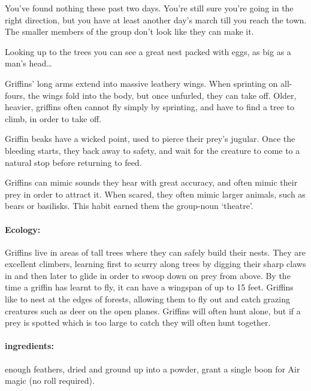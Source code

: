 \begin{multicols}{2}
\begin{boxtext}
  You've found nothing these past two days.
  You're still sure you're going in the right direction, but you have at least another day's march till you reach the town.
  The smaller members of the group don't look like they can make it.

  Looking up to the trees you can see a great nest packed with eggs, as big as a man's head\ldots
\end{boxtext}

Griffins' long arms extend into massive leathery wings.
When sprinting on all-fours, the wings fold into the body, but once unfurled, they can take off.
Older, heavier, griffins often cannot fly simply by sprinting, and have to find a tree to climb, in order to take off.

Griffin beaks have a wicked point, used to pierce their prey's jugular.
Once the bleeding starts, they back away to safety, and wait for the creature to come to a natural stop before returning to feed.

Griffins can mimic sounds they hear with great accuracy, and often mimic their prey in order to attract it.
When scared, they often mimic larger animals, such as bears or basilisks.
This habit earned them the group-noun `theatre'.


\paragraph{Ecology:} Griffins live in areas of tall trees where they can safely build their nests.
They are excellent climbers, learning first to scurry along trees by digging their sharp claws in and then later to glide in order to swoop down on prey from above.
By the time a griffin has learnt to fly, it can have a wingspan of up to 15 feet.
Griffins like to nest at the edges of forests, allowing them to fly out and catch grazing creatures such as deer on the open planes.
Griffins will often hunt alone, but if a prey is spotted which is too large to catch  they will often hunt together.

\paragraph{\Glspl{ingredient}:}
enough feathers, dried and ground up into a powder, grant a single \gls{boon} for Air magic (no roll required).


\end{multicols}
